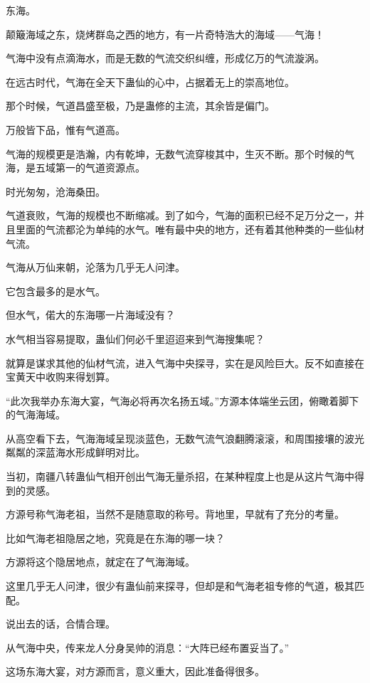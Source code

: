 
\begin{this_body}

东海。

颠簸海域之东，烧烤群岛之西的地方，有一片奇特浩大的海域——气海！

气海中没有点滴海水，而是无数的气流交织纠缠，形成亿万的气流漩涡。

在远古时代，气海在全天下蛊仙的心中，占据着无上的崇高地位。

那个时候，气道昌盛至极，乃是蛊修的主流，其余皆是偏门。

万般皆下品，惟有气道高。

气海的规模更是浩瀚，内有乾坤，无数气流穿梭其中，生灭不断。那个时候的气海，是五域第一的气道资源点。

时光匆匆，沧海桑田。

气道衰败，气海的规模也不断缩减。到了如今，气海的面积已经不足万分之一，并且里面的气流都沦为单纯的水气。唯有最中央的地方，还有着其他种类的一些仙材气流。

气海从万仙来朝，沦落为几乎无人问津。

它包含最多的是水气。

但水气，偌大的东海哪一片海域没有？

水气相当容易提取，蛊仙们何必千里迢迢来到气海搜集呢？

就算是谋求其他的仙材气流，进入气海中央探寻，实在是风险巨大。反不如直接在宝黄天中收购来得划算。

“此次我举办东海大宴，气海必将再次名扬五域。”方源本体端坐云团，俯瞰着脚下的气海海域。

从高空看下去，气海海域呈现淡蓝色，无数气流气浪翻腾滚滚，和周围接壤的波光粼粼的深蓝海水形成鲜明对比。

当初，南疆八转蛊仙气相开创出气海无量杀招，在某种程度上也是从这片气海中得到的灵感。

方源号称气海老祖，当然不是随意取的称号。背地里，早就有了充分的考量。

比如气海老祖隐居之地，究竟是在东海的哪一块？

方源将这个隐居地点，就定在了气海海域。

这里几乎无人问津，很少有蛊仙前来探寻，但却是和气海老祖专修的气道，极其匹配。

说出去的话，合情合理。

从气海中央，传来龙人分身吴帅的消息：“大阵已经布置妥当了。”

这场东海大宴，对方源而言，意义重大，因此准备得很多。


\end{this_body}
